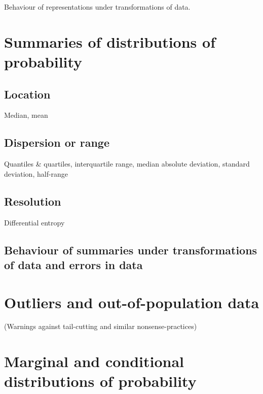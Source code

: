 \documentclass[]{book}
\begin{document}
Behaviour of representations under transformations of data.

\hypertarget{summaries-of-distributions-of-probability}{%
\section{Summaries of distributions of probability}\label{summaries-of-distributions-of-probability}}

\hypertarget{location}{%
\subsection{Location}\label{location}}

Median, mean

\hypertarget{dispersion-or-range}{%
\subsection{Dispersion or range}\label{dispersion-or-range}}

Quantiles \& quartiles, interquartile range, median absolute deviation, standard deviation, half-range

\hypertarget{resolution}{%
\subsection{Resolution}\label{resolution}}

Differential entropy

\hypertarget{behaviour-of-summaries-under-transformations-of-data-and-errors-in-data}{%
\subsection{Behaviour of summaries under transformations of data and errors in data}\label{behaviour-of-summaries-under-transformations-of-data-and-errors-in-data}}

\hypertarget{outliers-and-out-of-population-data}{%
\section{Outliers and out-of-population data}\label{outliers-and-out-of-population-data}}

(Warnings against tail-cutting and similar nonsense-practices)

\hypertarget{marginal-and-conditional-distributions-of-probability}{%
\section{Marginal and conditional distributions of probability}\label{marginal-and-conditional-distributions-of-probability}}
\end{document}
